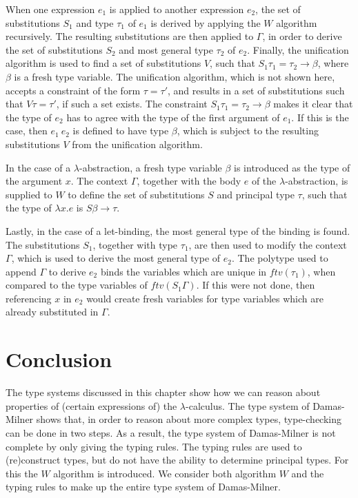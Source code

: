 When one expression $e_1$ is applied to another expression $e_2$, the set of substitutions $S_1$ and type $\tau_1$ of $e_1$ is derived by applying the $W$ algorithm recursively.
The resulting substitutions are then applied to $\Gamma$, in order to derive the set of substitutions $S_2$ and most general type $\tau_2$ of $e_2$.
Finally, the unification algorithm is used to find a set of substitutions $V$, such that $S_1 \tau_1 = \tau_2 \to \beta$, where $\beta$ is a fresh type variable.
The unification algorithm, which is not shown here, accepts a constraint of the form $\tau = \tau'$, and results in a set of substitutions such that $V\tau = \tau'$, if such a set exists.
The constraint $S_1 \tau_1 = \tau_2 \to \beta$ makes it clear that the type of $e_2$ has to agree with the type of the first argument of $e_1$.
If this is the case, then $e_1 \: e_2$ is defined to have type $\beta$, which is subject to the resulting substitutions $V$ from the unification algorithm.

In the case of a $\lambda$-abstraction, a fresh type variable $\beta$ is introduced as the type of the argument $x$.
The context $\Gamma$, together with the body $e$ of the $\lambda$-abstraction, is supplied to $W$ to define the set of substitutions $S$ and principal type $\tau$, such that the type of $\lambda x.e$ is $S\beta \to \tau$.

Lastly, in the case of a let-binding, the most general type of the binding is found.
The substitutions $S_1$, together with type $\tau_1$, are then used to modify the context $\Gamma$, which is used to derive the most general type of $e_2$.
The polytype used to append $\Gamma$ to derive $e_2$ binds the variables which are unique in $\textit{ftv}(\tau_1)$, when compared to the type variables of $\textit{ftv}(S_1\Gamma)$. 
If this were not done, then referencing $x$ in $e_2$ would create fresh variables for type variables which are already substituted in $\Gamma$.

\section{Conclusion}
The type systems discussed in this chapter show how we can reason about properties of (certain expressions of) the $\lambda$-calculus.
The type system of Damas-Milner shows that, in order to reason about more complex types, type-checking can be done in two steps.
As a result, the type system of Damas-Milner is not complete by only giving the typing rules.
The typing rules are used to (re)construct types, but do not have the ability to determine principal types.
For this the $W$ algorithm is introduced.
We consider both algorithm $W$ and the typing rules to make up the entire type system of Damas-Milner.

